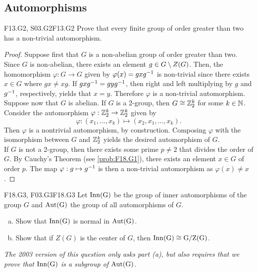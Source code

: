 \documentclass[../AlgebraQualSolutions.tex]{subfiles}
\begin{document}
\subsection{Automorphisms}

\begin{prob}{F13.G2, S03.G2}{F13.G2}
	Prove that every finite group of order greater than two has a non-trivial automorphism.
\end{prob}

\begin{proof}
Suppose first that $G$ is a non-abelian group of order greater than two. Since $G$ is non-abelian, there exists an element $g \in G \setminus Z(G)$. Then, the homomorphism $\varphi: G \to G$ given by $\varphi(x) = gxg^{-1}$ is non-trivial since there exists $x \in G$ where $gx \neq xg$. If $gxg^{-1} = gyg^{-1}$, then right and left multiplying by $g$ and $g^{-1}$, respectively, yields that $x = y$. Therefore $\varphi$ is a non-trivial automorphism.\\

Suppose now that $G$ is abelian. If $G$ is a 2-group, then $G \cong \mathbb{Z}_2^k$ for some $k \in \mathbb{N}$. Consider the automorphism $\varphi: \mathbb{Z}_2^k \to \mathbb{Z}_2^k$ given by 
	\[\varphi: (x_1,\ldots, x_k) \mapsto (x_2, x_1, \ldots, x_k).\]
Then $\varphi$ is a nontrivial automorphism, by construction. Composing $\varphi$ with the isomorphism between $G$ and $\mathbb{Z}_2^k$ yields the desired automorphism of $G$.\\

If $G$ is not a 2-group, then there exists some prime $p \neq 2$ that divides the order of $G$. By Cauchy's Theorem (see \ref{prob:F18.G1}), there exists an element $x \in G$ of order $p$. The map $\varphi: g \mapsto g^{-1}$ is then a non-trivial automorphism as $\varphi(x) \neq x$.
\end{proof}

\begin{prob}{F18.G3, F03.G3}{F18.G3}
    Let $\rm{Inn}(G)$ be the group of inner automorphisms of the group $G$ and $\rm{Aut}(G)$ the group of all automorphisms of $G$.
    \begin{enumerate}[(a)]
        \item Show that $\rm{Inn}(G)$ is normal in $\rm{Aut}(G)$.
        \item Show that if $Z(G)$ is the center of $G$, then $\rm{Inn}(G) \cong G/Z(G)$.
    \end{enumerate}
\end{prob}

\emph{The 2003 version of this question only asks part (a), but also requires that we prove that $\rm{Inn}(G)$ is a subgroup of $\rm{Aut}(G)$.}
\end{document}
